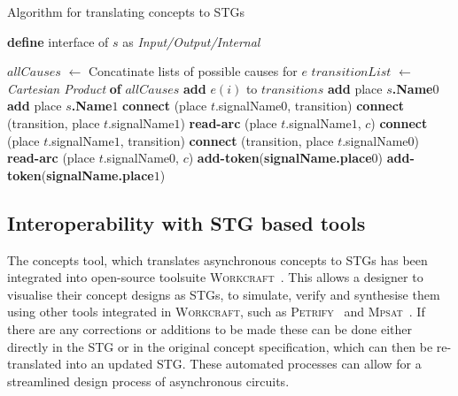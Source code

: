 \documentclass[british,conference,compsoc]{IEEEtran}
\newcommand{\noun}[1]{\textsc{#1}}
\begin{document}
\begin{algorithm}[H]
\begin{algorithmic}
\caption{Algorithm for translating concepts to STGs\label{alg:translation}}
  \State \textbf{define} interface of $s$ as \emph{Input/Output/Internal}
\EndFor

  \State $allCauses$ $\leftarrow$ Concatinate lists of possible causes for $e$
  \State $transitionList$ $\leftarrow$ \emph{Cartesian Product} \textbf{of} 
	$allCauses$
    \State \textbf{add} $e(i)$ to $transitions$
  \EndFor 
\EndFor
{}
  \State \textbf{add} place \textbf{$s$.Name}$0$
  \State \textbf{add} place \textbf{$s$.Name}$1$
\EndFor
{}
    \State \textbf{connect} (place $t$.signalName$0$, transition)
    \State \textbf{connect} (transition, place $t$.signalName$1$)
      \State \textbf{read-arc} (place $t$.signalName$1$, $c$)
    \EndFor
  \EndIf
    \State \textbf{connect} (place $t$.signalName$1$, transition)
    \State \textbf{connect} (transition, place $t$.signalName$0$)
      \State \textbf{read-arc} (place $t$.signalName$0$, $c$)
    \EndFor
  \EndIf
\EndFor
{}
    \State \textbf{add-token}(\textbf{signalName.place}$0$)
  \EndIf 
    \State \textbf{add-token}(\textbf{signalName.place}$1$)
  \EndIf
\EndFor
\end{algorithmic}
\end{algorithm}


\subsection{Interoperability with STG based tools \label{sub:interop-with-stg}}

The concepts tool, which translates asynchronous concepts to STGs has been
integrated into open-source toolsuite \noun{Workcraft}~\cite{Workcraft_website}.
This allows a designer to visualise their concept designs as STGs, to simulate,
verify and synthesise them using other tools integrated in \noun{Workcraft},
such as \noun{Petrify}~\cite{Cortadella} and
\noun{Mpsat}~\cite{khomenko2004detecting}.
If there are any corrections or additions to be made these can be done
either directly in the STG or in the original concept specification, which can 
then be re-translated into an updated STG. These automated processes can allow 
for a streamlined design process of asynchronous circuits.
\end{document}
